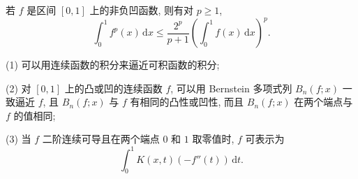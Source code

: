 \documentclass[../../main.tex]{subfiles}
\begin{document}
\begin{theorem}[Favard不等式]\label{theorem:Favard(法瓦尔)不等式}
若 \( f \) 是区间 \([0,1]\) 上的非负凹函数, 则有对 \( p \geqslant 1 \),
\[
\int_{0}^{1} f^p(x) \, \mathrm{d}x \leqslant \frac{2^p}{p + 1} \left( \int_{0}^{1} f(x) \, \mathrm{d}x \right)^p.
\]
\end{theorem}
\begin{remark}
(1) 可以用连续函数的积分来逼近可积函数的积分;

(2) 对 \([0,1]\) 上的凸或凹的连续函数 \( f \), 可以用 Bernstein 多项式列 \( B_n(f; x) \) 一致逼近 \( f \), 且 \( B_n(f; x) \) 与 \( f \) 有相同的凸性或凹性, 而且 \( B_n(f; x) \) 在两个端点与 \( f \) 的值相同;

(3) 当 \( f \) 二阶连续可导且在两个端点 \( 0 \) 和 \( 1 \) 取零值时, \( f \) 可表示为
\[
\int_{0}^{1} K(x, t)(-f''(t)) \, \mathrm{d}t.
\]
\end{remark}
\end{document}
